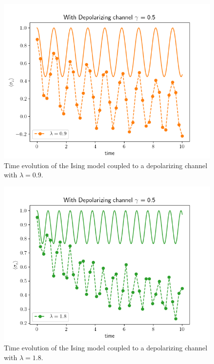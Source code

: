 \documentclass[12pt, twocolumn]{article}
\begin{document}
  \begin{figure}%
    \centering
    \includegraphics[width=\columnwidth, right]{images/DepolChannelLambda09.png}
    \caption{Time evolution of the Ising model coupled to a depolarizing channel with \( \lambda = 0.9 \).%
      \label{fig:DepolChannelLambda09}}
  \end{figure}

  \begin{figure}%
    \centering
    \includegraphics[width=\columnwidth, inner]{images/DepolChannelLambda18.png}
    \caption{Time evolution of the Ising model coupled to a depolarizing channel with \( \lambda = 1.8 \).%
      \label{fig:DepolChannelLambda18}}
  \end{figure}
\end{document}
